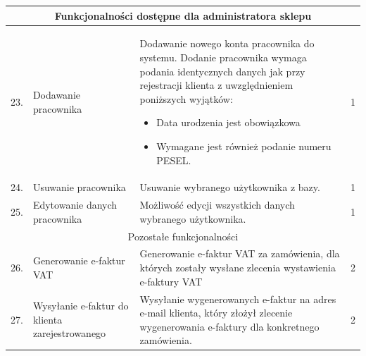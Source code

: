 \documentclass[10pt,a4paper]{article}
\begin{document}
\begin{longtable}{| m{0.5cm} | m{4cm} | p{6cm} | m{1.5cm} |}
			\multicolumn{4}{|c|}{Funkcjonalności dostępne dla administratora sklepu}\\ \hline
			23.&Dodawanie pracownika				   & Dodawanie nowego konta pracownika do systemu.
														 Dodanie pracownika wymaga podania identycznych
														 danych jak przy rejestracji klienta
														 z uwzględnieniem poniższych wyjątków:
														 \begin{itemize}[label={--}]
														 \item Data urodzenia jest obowiązkowa
														 \item Wymagane jest również podanie numeru PESEL.  
														 \end{itemize}									& 1\\ \hline
			24.&Usuwanie pracownika					   & Usuwanie wybranego użytkownika z bazy.			& 1\\ \hline
			25.&Edytowanie danych pracownika		   & Możliwość edycji wszystkich danych 
														 wybranego użytkownika.							& 1\\ \hline
     		\multicolumn{4}{|c|}{Pozostałe funkcjonalności}\\ \hline
			26.&Generowanie e-faktur VAT			   & Generowanie e-faktur VAT za zamówienia,
														 dla których zostały wysłane zlecenia 
														 wystawienia e-faktury VAT						& 2\\ \hline
			27.&Wysyłanie e-faktur do klienta
			    zarejestrowanego					   & Wysyłanie wygenerowanych e-faktur na 
			    										 adres e-mail klienta, który złożył 
			    										 zlecenie wygenerowania e-faktury 
			    										 dla konkretnego zamówienia.					& 2\\ \hline


    \end{longtable}
    \newpage
\end{document}
